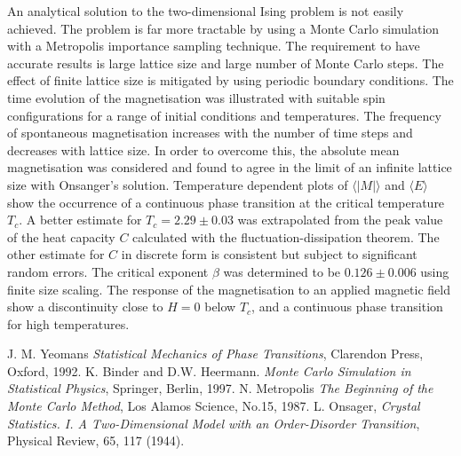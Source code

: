 \documentclass[a4paper]{article}
\begin{document}
An analytical solution to the two-dimensional Ising problem is not easily achieved. The problem is far more tractable by using a Monte Carlo simulation with a Metropolis importance sampling technique. The requirement to have accurate results is large lattice size and large number of Monte Carlo steps. The effect of finite lattice size is mitigated by using periodic boundary conditions. The time evolution of the magnetisation was illustrated with suitable spin configurations for a range of initial conditions and temperatures. The frequency of spontaneous magnetisation increases with the number of time steps and decreases with lattice size. In order to overcome this, the absolute mean magnetisation was considered and found to agree in the limit of an infinite lattice size with Onsanger's solution. Temperature dependent plots of $\langle |M| \rangle$ and $\langle E \rangle$ show the occurrence of a continuous phase transition at the critical temperature $T_c$. A better estimate for $T_c = 2.29 \pm 0.03$ was extrapolated from the peak value of the heat capacity $C$ calculated with the fluctuation-dissipation theorem. The other estimate for $C$ in discrete form is consistent but subject to significant random errors. The critical exponent $\beta$ was determined to be $0.126 \pm 0.006$ using finite size scaling. The response of the magnetisation to an applied magnetic field show a discontinuity close to $H = 0$ below $T_c$, and a continuous phase transition for high temperatures. 

\begin{thebibliography}{3}

 J. M. Yeomans \emph{Statistical Mechanics of Phase Transitions}, Clarendon Press, Oxford, 1992.
  K. Binder and D.W. Heermann. \emph{Monte Carlo Simulation in Statistical Physics}, Springer, Berlin, 1997.
  N. Metropolis \emph{The Beginning of the Monte Carlo Method}, Los Alamos Science, No.15, 1987. 
  L. Onsager, \emph{Crystal Statistics. I. A Two-Dimensional Model with an Order-Disorder Transition}, Physical Review, 65, 117 (1944).
 
\end{thebibliography}

\appendix
\end{document}
